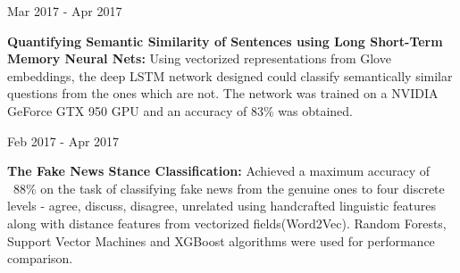 \begin{cventries}
  \cventry
    {} 
    {} 
    {} 
    {Mar 2017 - Apr 2017} 
    {
      \begin{cvitems}
        \item { \textbf{Quantifying Semantic Similarity of Sentences using Long Short-Term Memory Neural Nets:} Using vectorized representations from Glove embeddings, the deep LSTM network designed could classify semantically similar questions from the ones which are not. The network was trained on a NVIDIA GeForce GTX 950 GPU and an accuracy of 83\% was obtained.}
      \end{cvitems}
    }
  \cventry
    {}
    {}
    {} 
    {Feb 2017 - Apr 2017} 
    {
      \begin{cvitems}
      \item { \textbf{The Fake News Stance Classification:} Achieved a maximum accuracy of ~88\% on the task of classifying fake news from the genuine ones to four discrete levels - agree, discuss, disagree, unrelated using handcrafted linguistic features along with distance features from vectorized fields(Word2Vec). Random Forests, Support Vector Machines and XGBoost algorithms were used for performance comparison.}
      \end{cvitems}
    }
\end{cventries}
